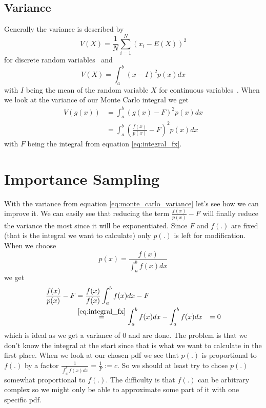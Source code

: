 \subsection{Variance}
\label{sec:variance}
Generally the variance is described by $$ V(X) = \frac{1}{N} \sum_{i = 1}^N (x_i - E(X))^2 $$ for discrete random variables~\cite{pris}
and $$ V(X) = \int_{a}^b (x - I)^2 p(x) dx $$ with $ I $ being the mean of the random variable $ X $ for continuous variables~\cite{wyzant}.
When we look at the variance of our Monte Carlo integral we get
\begin{equation}
\label{eq:monte_carlo_variance}
\begin{aligned}
    V(g(x)) &= \int_{a}^b (g(x) - F)^2 p(x) dx \\
            &= \int_{a}^b \left(\frac{f(x)}{p(x)} - F\right)^2 p(x) dx
\end{aligned}
\end{equation}
with $ F $ being the integral from equation \ref{eq:integral_fx}.


\section{Importance Sampling}
\label{sec:importance_sampling}
With the variance from equation \ref{eq:monte_carlo_variance} let's see how we can improve it.
We can easily see that reducing the term $ \frac{f(x)}{p(x)} - F $ will finally reduce the variance the most since it will be exponentiated.
Since $ F $ and $ f(.) $ are fixed (that is the integral we want to calculate) only $ p(.) $ is left for modification.
When we choose $$ p(x) = \frac{f(x)}{\int_{a}^b f(x) dx} $$ we get
\begin{equation*}
\begin{aligned}
    \frac{f(x)}{p(x)} - F &= \frac{f(x)}{f(x)}\int_{a}^b f(x) dx - F \\
        &\stackrel{\ref{eq:integral_fx}}{=} \int_{a}^b f(x) dx - \int_{a}^b f(x) dx
        &= 0
\end{aligned}
\end{equation*}
which is ideal as we get a variance of 0 and are done.
The problem is that we don't know the integral at the start since that is what we want to calculate in the first place.
When we look at our chosen pdf we see that $ p(.) $ is proportional to $ f(.) $ by a factor $ \frac{1}{\int_{a}^b f(x) dx} = \frac{1}{F} := c $.
So we should at least try to chose $ p(.) $ somewhat proportional to $ f(.) $.
The difficulty is that $ f(.) $ can be arbitrary complex so we might only be able to approximate some part of it with one specific pdf.


